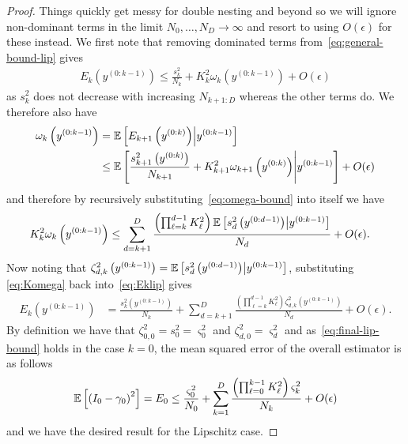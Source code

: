 \begin{proof}
Things quickly get messy for double nesting and beyond so we will
ignore non-dominant terms in the limit $N_0,\dots,N_D \rightarrow \infty$
and resort to using $O(\epsilon)$ for these instead. 
We first note that removing dominated terms from~\eqref{eq:general-bound-lip} gives
\begin{align}
	\label{eq:Eklip}
E_k \left(y^{(0:k-1)}\right) \le 
\frac{s_k^2}{N_k} + K_k^2 \omega_k \left(y^{(0:k-1)}\right) + O(\epsilon)
\end{align}
as $s_k^2$ does not decrease with increasing $N_{k+1:D}$ whereas the other
terms do.  We therefore also have
\begin{align}
\omega_k \left(y^{(0:k-1)}\right) &= \mathbb{E} \left[E_{k+1} 
\left(y^{(0:k)}\right) \middle|  y^{(0:k-1)} \right] \nonumber \\ &\le \mathbb{E} \left[ \frac{s_{k+1}^2\left(y^{(0:k)}\right)}
{N_{k+1}} + K^2_{k+1} \omega_{k+1} \left(y^{(0:k)}\right) \middle|
y^{(0:k-1)}\right] + O(\epsilon) \label{eq:omega-bound}
\end{align}
and therefore by recursively substituting~\eqref{eq:omega-bound} into itself
we have
\begin{align}
	\label{eq:Komega}
	K_k^2\omega_k \left(y^{(0:k-1)}\right) &\le
	\sum_{d=k+1}^{D} \frac{\left(\prod_{\ell=k}^{d-1} K_{\ell}^2\right)
		\mathbb{E} \left[ s_{d}^2 \left(y^{(0:d-1)}\right) \middle|
		y^{(0:k-1)}\right]}{N_{d}}+ O(\epsilon).
\end{align}
Now noting that $\zeta_{d,k}^2\left(y^{(0:k-1)}\right) =
\mathbb{E} \left[ s_{d}^2 \left(y^{(0:d-1)}\right) \middle| y^{(0:k-1)}\right]$, substituting
\eqref{eq:Komega} back into~\eqref{eq:Eklip} gives
\begin{align}
E_k \left(y^{(0:k-1)}\right) 
&= \frac{s_k^2\left(y^{(0:k-1)}\right)}{N_k} +
\sum_{d=k+1}^{D} \frac{\left(\prod_{\ell=k}^{d-1} K_{\ell}^2\right)
	\zeta_{d,k}^2\left(y^{(0:k-1)}\right)}{N_{d}}+ O(\epsilon).
\label{eq:final-lip-bound}
\end{align}
By definition we have that
$\zeta_{0,0}^2 = s_0^2 =\varsigma_0^2$ and $\zeta_{d,0}^2 = \varsigma_d^2$ and
as~\eqref{eq:final-lip-bound} holds in the case $k=0$, 
the mean squared error of the overall estimator is as follows
\begin{align}
\mathbb{E} \left[\left(I_0-\gamma_0\right)^2\right] 
= E_0 \le 
\frac{\varsigma_{0}^2}{N_0} +
\sum_{k=1}^{D} \frac{\left(\prod_{\ell=0}^{k-1} K_{\ell}^2\right)
	\varsigma_{k}^2}{N_{k}}+ O(\epsilon)
\end{align}
and we have the desired result for the Lipschitz case.


\end{proof}
